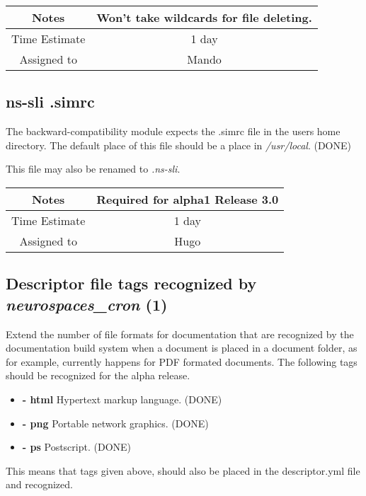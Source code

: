 \documentclass[12pt]{article}
\begin{document}
{
  \vspace{5mm}
  \centering
  \begin{tabular}{|c|c|}
    \hline
    Notes
    & Won't take wildcards for file deleting. \\
    \hline
    Time Estimate
    & 1 day \\
    \hline
    Assigned to
    & Mando \\
    \hline
  \end{tabular}
}


\subsection{ns-sli .simrc}

The backward-compatibility module expects the .simrc file in the users
home directory.  The default place of this file should be a place in
{\it /usr/local}. (DONE)

This file may also be renamed to {\it .ns-sli}.

{
  \vspace{5mm}
  \centering
  \begin{tabular}{|c|c|}
    \hline
    Notes
    & Required for alpha1 Release 3.0 \\
    \hline
    Time Estimate
    & 1 day \\
    \hline
    Assigned to
    & Hugo \\
    \hline
  \end{tabular}
}


\subsection{Descriptor file tags recognized by {\it neurospaces\_cron} (1)}

Extend the number of file formats for documentation that are
recognized by the documentation build system when a document is placed
in a document folder, as for example, currently happens for PDF
formated documents. The following tags should be recognized for the
alpha release.
\begin{itemize}
   \item[]{\bf - html} Hypertext markup language. (DONE)
    \item[]{\bf - png} Portable network graphics. (DONE)
    \item[]{\bf - ps} Postscript. (DONE)
\end{itemize}
This means that tags given above, should also be placed in the
descriptor.yml file and recognized.
\end{document}
